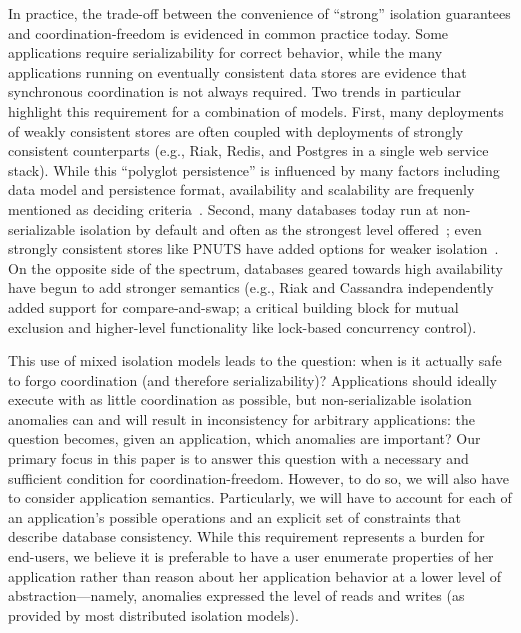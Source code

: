 
 In practice, the
trade-off between the convenience of ``strong'' isolation guarantees
and coordination-freedom is evidenced in common practice today. Some
applications require serializability for correct behavior, while the
many applications running on eventually consistent data stores are
evidence that synchronous coordination is not always required. Two
trends in particular highlight this requirement for a combination of
models. First, many deployments of weakly consistent stores are often
coupled with deployments of strongly consistent counterparts (e.g.,
Riak, Redis, and Postgres in a single web service stack). While this
``polyglot persistence'' is influenced by many factors including data
model and persistence format, availability and scalability are
frequenly mentioned as deciding criteria~\cite{polyglot}. Second, many
databases today run at non-serializable isolation by default and often
as the strongest level offered~\cite{hat-vldb}; even strongly
consistent stores like PNUTS have added options for weaker
isolation~\cite{pnuts-update}. On the opposite side of the spectrum,
databases geared towards high availability have begun to add stronger
semantics (e.g., Riak and Cassandra independently added support for
compare-and-swap; a critical building block for mutual exclusion and
higher-level functionality like lock-based concurrency control).

This use of mixed isolation models leads to the question: when is it
actually safe to forgo coordination (and therefore serializability)?
Applications should ideally execute with as little coordination as
possible, but non-serializable isolation anomalies can and will result
in inconsistency for arbitrary applications: the question becomes,
given an application, which anomalies are important? Our primary focus
in this paper is to answer this question with a necessary and
sufficient condition for coordination-freedom. However, to do so, we
will also have to consider application semantics. Particularly, we
will have to account for each of an application's possible operations
and an explicit set of constraints that describe database
consistency. While this requirement represents a burden for end-users,
we believe it is preferable to have a user enumerate properties of her
application rather than reason about her application behavior at a
lower level of abstraction---namely, anomalies expressed the level of
reads and writes (as provided by most distributed isolation models).

